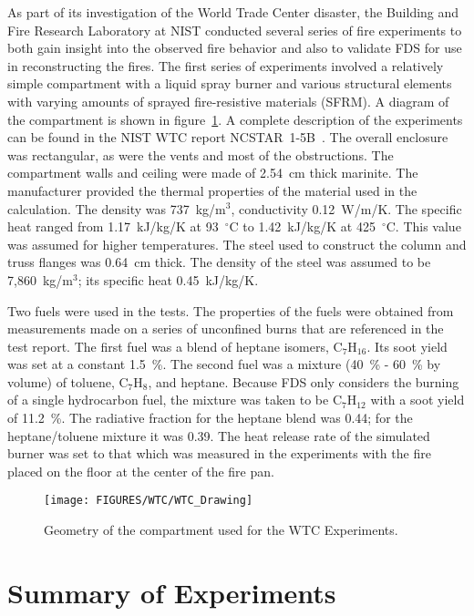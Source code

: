 As part of its investigation of the World Trade Center disaster, the Building and Fire Research Laboratory at NIST conducted several series of fire experiments to both gain insight into the
observed fire behavior and also to validate FDS for use in reconstructing the fires. The first series of experiments involved a relatively simple compartment with a liquid spray burner and
various structural elements with varying amounts of sprayed fire-resistive materials (SFRM). A diagram of the compartment is shown in figure~\ref{WTC_Drawing}.
A complete description of the experiments can be found in the NIST WTC report NCSTAR~1-5B~\cite{NIST_NCSTAR_1-5B}.
The overall enclosure was rectangular, as were the vents and most of the obstructions. The compartment walls and ceiling were made of 2.54~cm thick marinite. The manufacturer provided the thermal properties of the material used in the calculation. The density was 737~kg/m$^3$, conductivity 0.12~W/m/K. The specific heat ranged from 1.17~kJ/kg/K at 93~$^\circ$C to
1.42~kJ/kg/K at 425~$^\circ$C. This value was assumed for higher temperatures.
The steel used to construct the column and truss flanges was 0.64~cm thick.  The density of the steel was assumed to be 7,860~kg/m$^3$; its specific heat 0.45~kJ/kg/K.

Two fuels were used in the tests. The properties of the fuels were obtained from measurements made on a series of unconfined burns that are referenced in the test report.
The first fuel was a blend of heptane isomers, C$_7$H$_{16}$. Its soot yield was set at a constant 1.5~\%. The second fuel was a mixture (40~\% - 60~\% by volume) of toluene, C$_7$H$_8$,
and heptane. Because FDS only considers the burning of a single hydrocarbon fuel, the mixture was taken to be C$_7$H$_{12}$ with a soot yield of 11.2~\%.
The radiative fraction for the heptane blend was 0.44; for the heptane/toluene mixture it was 0.39.
The heat release rate of the simulated burner was set to that which was measured in the experiments with the fire placed on the floor at the center of the fire pan.

\begin{figure}[p]
\begin{center}
\texttt{[image: FIGURES/WTC/WTC\_Drawing]}
\end{center}
\caption[Geometry of the WTC Experiments]{Geometry of the compartment used for the WTC Experiments.}
\label{WTC_Drawing}
\end{figure}


\section{Summary of Experiments}

